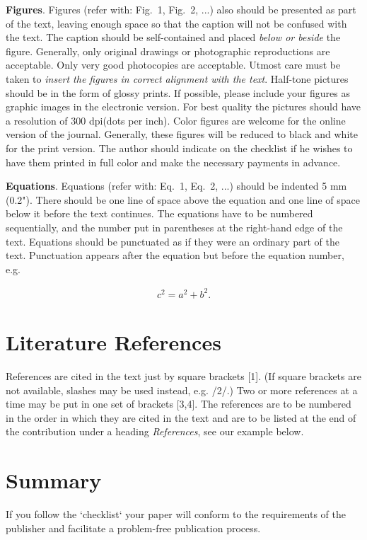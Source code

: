 \documentclass{TTP}
\begin{document}
\textbf{Figures}. Figures (refer with: Fig.~1, Fig.~2, ...) also should be presented as part of the text, leaving enough space so that the 
caption will not be confused with the text. The caption should be self-contained and placed \textit{below or beside }the 
figure. Generally, only original drawings or photographic reproductions are acceptable. Only very good photocopies are 
acceptable. Utmost care must be taken to \textit{insert the figures in correct alignment with the text}. Half-tone pictures
 should be in the form of glossy prints. If possible, please include your figures as graphic images in the electronic version. 
For best quality the pictures should have a resolution of 300 dpi(dots per inch).
\noindent Color figures are welcome for the online version of the journal. Generally, these figures will be reduced to black 
and white for the print version. The author should indicate on the checklist if he wishes to have them printed in full color 
and make the necessary payments in advance.

\vspace{6pt}
\textbf{Equations}.  Equations (refer with: Eq.~1, Eq.~2, ...) should be indented 5 mm (0.2"). 
There should be one line of space above the equation and one line of space below it before the text continues. 
The equations have to be numbered sequentially, and the number put in parentheses at the right-hand edge of the 
text. Equations should be punctuated as if they were an ordinary part of the text. Punctuation appears after the 
equation but before the equation number, e.g.

\begin{eqnarray}
c^2 = a^2 + b^2.                                                                
\end{eqnarray}

\section{Literature References}

\noindent References are cited in the text just by square brackets [1].
 (If square brackets are not available, slashes may be used instead, e.g. /2/.) 
Two or more references at a time may be put in one set of brackets [3,4]. The 
references are to be numbered in the order in which they are cited in the text and 
are to be listed at the end of the contribution under a heading \textit{References}, 
see our example below. 

\section{Summary}
\noindent If you follow the `checklist` your paper will conform to the requirements
 of the publisher and facilitate a problem-free publication process.
\end{document}
